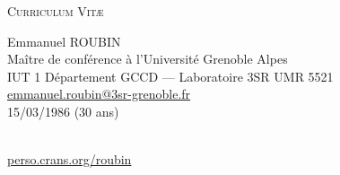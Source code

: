 \documentclass[a4paper,11pt]{article}
\begin{document}
\begin{center} \par\textsc{\huge Curriculum Vit\ae} \end{center}
\begin{minipage}{0.7\linewidth}
  \begin{flushleft}
    \LARGE Emmanuel ROUBIN \normalsize  \vspace{0.1cm} \\
    \large Maître de conférence à l'Université Grenoble Alpes \normalsize\\\vspace{0.2cm}
    IUT 1 Département GCCD --- Laboratoire 3SR UMR 5521\\
    \href{mailto:emmanuel.roubin@3sr-grenoble.fr}{emmanuel.roubin@3sr-grenoble.fr}\\\vspace{0.2cm}
    15/03/1986 (30 ans)
  \end{flushleft}
\end{minipage}
\hfill
\begin{minipage}{4cm}
  \centering
   \\ \vspace{0.1cm}
  \footnotesize\href{http://perso.crans.org/roubin}{perso.crans.org/roubin}
\end{minipage}
\vfill
\end{document}
